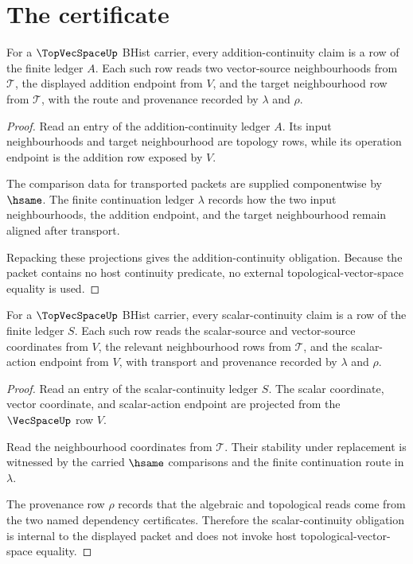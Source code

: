 \section{The certificate}
\label{sec:topvecspace-certificate}

\begin{theorem}
\label{thm:topvecspace-continuous-addition-obligation}
For a $\TopVecSpaceUp$ BHist carrier, every addition-continuity claim is a row of the finite ledger $A$. Each such row reads two vector-source neighbourhoods from $\mathcal T$, the displayed addition endpoint from $V$, and the target neighbourhood row from $\mathcal T$, with the route and provenance recorded by $\lambda$ and $\rho$.
\end{theorem}
\begin{proof}
Read an entry of the addition-continuity ledger $A$. Its input neighbourhoods and target neighbourhood are topology rows, while its operation endpoint is the addition row exposed by $V$.

The comparison data for transported packets are supplied componentwise by $\hsame$. The finite continuation ledger $\lambda$ records how the two input neighbourhoods, the addition endpoint, and the target neighbourhood remain aligned after transport.

Repacking these projections gives the addition-continuity obligation. Because the packet contains no host continuity predicate, no external topological-vector-space equality is used.
\end{proof}

\begin{theorem}
\label{thm:topvecspace-continuous-scalar-obligation}
For a $\TopVecSpaceUp$ BHist carrier, every scalar-continuity claim is a row of the finite ledger $S$. Each such row reads the scalar-source and vector-source coordinates from $V$, the relevant neighbourhood rows from $\mathcal T$, and the scalar-action endpoint from $V$, with transport and provenance recorded by $\lambda$ and $\rho$.
\end{theorem}
\begin{proof}
Read an entry of the scalar-continuity ledger $S$. The scalar coordinate, vector coordinate, and scalar-action endpoint are projected from the $\VecSpaceUp$ row $V$.

Read the neighbourhood coordinates from $\mathcal T$. Their stability under replacement is witnessed by the carried $\hsame$ comparisons and the finite continuation route in $\lambda$.

The provenance row $\rho$ records that the algebraic and topological reads come from the two named dependency certificates. Therefore the scalar-continuity obligation is internal to the displayed packet and does not invoke host topological-vector-space equality.
\end{proof}

